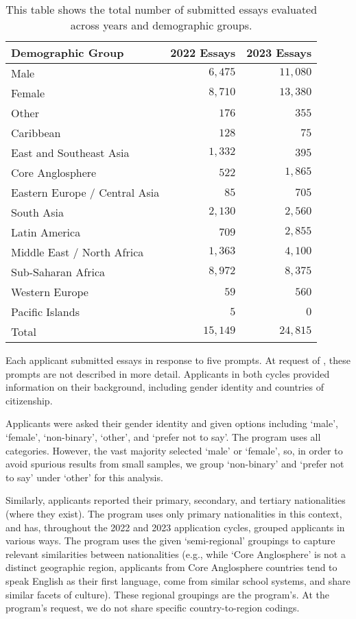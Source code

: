 \begin{table}[htbp]
    \centering
    \caption{This table shows the total number of submitted essays evaluated across years and demographic groups.}
    \label{tab:demo_counts}
    \begin{tabular}{ l r r }
        \toprule
        Demographic Group & 2022 Essays & 2023 Essays \\
        \midrule
        Male & $6,475$  & $11,080$ \\
        Female & $8,710$  & $13,380$ \\
        Other & $176$ & $355$ \\
        \midrule
        Caribbean & $128$ & $75$ \\
        East and Southeast Asia & $1,332$ & $395$ \\
        Core Anglosphere & $522$ & $1,865$ \\
        Eastern Europe / Central Asia & $85$ & $705$ \\
        South Asia & $2,130$ & $2,560$\\
        Latin America & $709$ & $2,855$ \\
        Middle East / North Africa & $1,363$ & $4,100$ \\
        Sub-Saharan Africa & $8,972$& $8,375$\\
        Western Europe & $59$ & $560$ \\
        Pacific Islands & $5$& $0$ \\
        \midrule
        Total & $15,149$ & $24,815$ \\
        \bottomrule
    \end{tabular}
\end{table}

Each applicant submitted essays in response to five prompts. At request of \rise, these prompts are not described in more detail. Applicants in both cycles provided information on their background, including gender identity and countries of citizenship. 

Applicants were asked their gender identity and given options including `male', `female', `non-binary', `other', and `prefer not to say'. The program uses all categories. However, the vast majority selected `male' or `female', so, in order to avoid spurious results from small samples, we group `non-binary' and `prefer not to say' under `other' for this analysis. 

Similarly, applicants reported their primary, secondary, and tertiary nationalities (where they exist). The program uses only primary nationalities in this context, and has, throughout the 2022 and 2023 application cycles, grouped applicants in various ways. The program uses the given `semi-regional' groupings to capture relevant similarities between nationalities (e.g., while `Core Anglosphere' is not a distinct geographic region, applicants from Core Anglosphere countries tend to speak English as their first language, come from similar school systems, and share similar facets of culture). These regional groupings are the program's. At the program's request, we do not share specific country-to-region codings.

